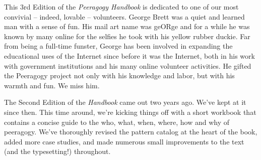 This 3rd Edition of the \emph{Peeragogy Handbook} is dedicated to one of
our most convivial -- indeed, lovable -- volunteers. George Brett was a
quiet and learned man with a sense of fun. His mail art name was geORge
and for a while he was known by many online for the selfies he took with
his yellow rubber duckie. Far from being a full-time funster, George has
been involved in expanding the educational uses of the Internet since
before it was the Internet, both in his work with government
institutions and his many online volunteer activities. He gifted the
Peeragogy project not only with his knowledge and labor, but with his
warmth and fun. We miss him.

The Second Edition of the \emph{Handbook} came out two years ago. We've
kept at it since then. This time around, we're kicking things off with a
short workbook that contains a concise guide to the who, what, when,
where, how and why of peeragogy. We've thoroughly revised the pattern
catalog at the heart of the book, added more case studies, and made
numerous small improvements to the text (and the typesetting!)
throughout.
